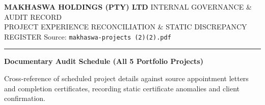 \documentclass[a4paper,landscape,10pt]{article}
\renewcommand{\arraystretch}{1.48}
\begin{document}
\noindent
\colorbox{MHNavy}{%
  \parbox{\dimexpr\textwidth-2\fboxsep\relax}{%
    \vspace{0.32cm}\hspace{0.35cm}%
    {\Large\bfseries\color{white}
    MAKHASWA HOLDINGS (PTY) LTD}\hfill
    {\footnotesize\color{white}
    INTERNAL GOVERNANCE \& AUDIT RECORD\hspace{0.35cm}}\\[4pt]
    \hspace{0.35cm}%
    {\normalsize\color{white}
    PROJECT EXPERIENCE RECONCILIATION \& STATIC DISCREPANCY REGISTER}%
    \hfill
    {\footnotesize\color{white}
    Source: \texttt{makhaswa-projects (2)(2).pdf}\hspace{0.35cm}}%
    \vspace{0.30cm}%
  }%
}

\vspace{0.08cm}
\noindent
\color{MHGold}\rule{\textwidth}{1.5pt}

\vspace{0.32cm}

{\normalsize\bfseries\color{MHNavy}
Documentary Audit Schedule (All 5 Portfolio Projects)}\par

\vspace{0.10cm}

{\footnotesize\color{MHMuted}
Cross-reference of scheduled project details against source appointment letters and completion certificates, recording static certificate anomalies and client confirmation.}\par

\vspace{0.25cm}

\begingroup

\fontsize{8.2pt}{10.6pt}\selectfont
\color{MHText}
\renewcommand{\arraystretch}{1.48}
\end{document}
